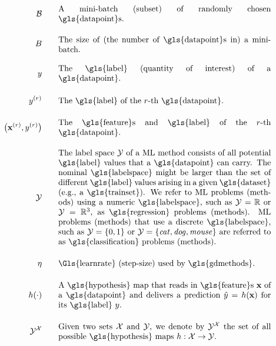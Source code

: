 \begin{align}
	\batch \quad\quad &\parbox{.75\textwidth}{A mini-batch (subset) of randomly chosen \gls{datapoint}s.} \nonumber
	\\[4mm] 
	\batchsize \quad\quad &\parbox{.75\textwidth}{The size of (the number of \gls{datapoint}s in) a mini-batch.} \nonumber   \\[4mm] 
	\truelabel \quad\quad &\parbox{.75\textwidth}{The \gls{label} (quantity of interest) of a \gls{datapoint}.} \nonumber   \\[4mm] 
	\truelabel^{(\sampleidx)} \quad\quad &\parbox{.75\textwidth}{The \gls{label} of the $\sampleidx$-th \gls{datapoint}.} \nonumber  \\[4mm] 
	\big(\featurevec^{(\sampleidx)},\truelabel^{(\sampleidx)}\big)  \quad\quad &\parbox{.75\textwidth}{The \gls{feature}s and \gls{label} of the $\sampleidx$-th \gls{datapoint}.} \nonumber  \\[4mm] 
	\labelspace  \quad\quad & \parbox{.75\textwidth}{The label space $\labelspace$ of 
		a ML method consists of all potential \gls{label} values that a \gls{datapoint} can 
		carry. The nominal \gls{labelspace} might be larger than the set of different \gls{label} 
		values arising in a given \gls{dataset} (e.g., a \gls{trainset}). We refer to ML problems 
		(methods) using a numeric \gls{labelspace}, such as $\labelspace=\mathbb{R}$ 
		or $\labelspace=\mathbb{R}^{3}$, as \gls{regression} problems (methods). ML problems (methods) 
		that use a discrete \gls{labelspace}, such as $\labelspace=\{0,1\}$ or $\labelspace=\{\mbox{\emph{cat}},\mbox{\emph{dog}},\mbox{\emph{mouse}}\}$ 
		are referred to as \gls{classification} problems (methods).}    \nonumber  \\[4mm] 
	\lrate  \quad\quad & \parbox{.75\textwidth}{\Gls{learnrate} (step-size) used by \gls{gdmethods}.}    \nonumber       \\[4mm] 
	\hypothesis(\cdot)  \quad\quad &\parbox{.75\textwidth}{A \gls{hypothesis} map that reads in \gls{feature}s $\featurevec$ of a \gls{datapoint} 
		and delivers a prediction $\hat{\truelabel}=\hypothesis(\featurevec)$ for its \gls{label} $\truelabel$.} \nonumber  	  \\[4mm] 
	 \labelspace^{\featurespace} \quad\quad & \parbox{.75\textwidth}{Given two sets $\featurespace$ and $\labelspace$, we denote by $ \labelspace^{\featurespace}$ the set of all possible \gls{hypothesis} maps $\hypothesis: \featurespace \rightarrow \labelspace$.} 	 \nonumber 
\end{align}                  


